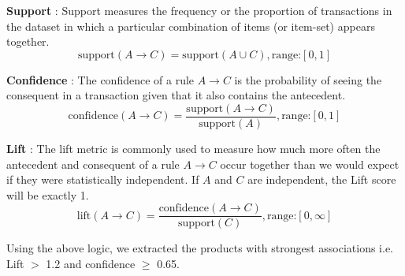 \documentclass[11pt]{article} %
\begin{document}
\textbf{Support} : Support measures the frequency or the proportion of transactions in the dataset in which a particular combination of items (or item-set) appears together.
\[ \text{support}(A \rightarrow C) = \text{support}(A \cup C), \text{range:} [0,1] \]

\textbf{Confidence} : The confidence of a rule \( A \rightarrow C \) is the probability of seeing the consequent in a transaction given that it also contains the antecedent.
\[ \text{confidence}(A \rightarrow C) = \frac{\text{support}(A \rightarrow C)}{\text{support}(A)}, \text{range:} [0,1] \]

\textbf{Lift} : The lift metric is commonly used to measure how much more often the antecedent and consequent of a rule \( A \rightarrow C \) occur together than we would expect if they were statistically independent. If \( A \) and \( C \) are independent, the Lift score will be exactly 1.
\[ \text{lift}(A \rightarrow C) = \frac{\text{confidence}(A \rightarrow C)}{\text{support}(C)}, \text{range:} [0, \infty] \]

Using the above logic, we extracted the products with strongest associations i.e. Lift \( > \) 1.2 and confidence \( \geq \) 0.65.
\end{document}
